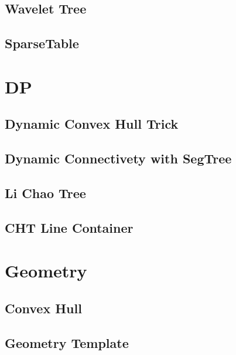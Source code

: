 \subsection{Wavelet Tree}
\raggedbottom
\hrulefill
\subsection{SparseTable}
\raggedbottom
\hrulefill

\section{DP}
\subsection{Dynamic Convex Hull Trick}
\raggedbottom
\hrulefill
\subsection{Dynamic Connectivety with SegTree}
\raggedbottom
\hrulefill
\subsection{Li Chao Tree}
\raggedbottom
\hrulefill
\subsection{CHT Line Container}
\raggedbottom
\hrulefill

\section{Geometry}
\subsection{Convex Hull}
\raggedbottom
\hrulefill
\subsection{Geometry Template}
\raggedbottom
\hrulefill
